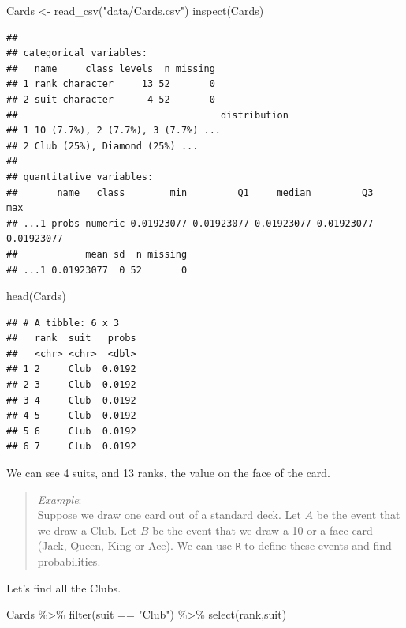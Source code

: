 \documentclass[
]{book}
\newenvironment{Shaded}{\begin{snugshade}}{\end{snugshade}}
\newcommand{\FunctionTok}[1]{\textcolor[rgb]{0.00,0.00,0.00}{#1}}
\newcommand{\NormalTok}[1]{#1}
\newcommand{\OtherTok}[1]{\textcolor[rgb]{0.56,0.35,0.01}{#1}}
\newcommand{\SpecialCharTok}[1]{\textcolor[rgb]{0.00,0.00,0.00}{#1}}
\newcommand{\StringTok}[1]{\textcolor[rgb]{0.31,0.60,0.02}{#1}}
\begin{document}
\begin{Shaded}
\begin{Highlighting}[]
\NormalTok{Cards }\OtherTok{\textless{}{-}} \FunctionTok{read\_csv}\NormalTok{(}\StringTok{"data/Cards.csv"}\NormalTok{)}
\FunctionTok{inspect}\NormalTok{(Cards)}
\end{Highlighting}
\end{Shaded}

\begin{verbatim}
## 
## categorical variables:  
##   name     class levels  n missing
## 1 rank character     13 52       0
## 2 suit character      4 52       0
##                                    distribution
## 1 10 (7.7%), 2 (7.7%), 3 (7.7%) ...            
## 2 Club (25%), Diamond (25%) ...                
## 
## quantitative variables:  
##       name   class        min         Q1     median         Q3        max
## ...1 probs numeric 0.01923077 0.01923077 0.01923077 0.01923077 0.01923077
##            mean sd  n missing
## ...1 0.01923077  0 52       0
\end{verbatim}

\begin{Shaded}
\begin{Highlighting}[]
\FunctionTok{head}\NormalTok{(Cards)}
\end{Highlighting}
\end{Shaded}

\begin{verbatim}
## # A tibble: 6 x 3
##   rank  suit   probs
##   <chr> <chr>  <dbl>
## 1 2     Club  0.0192
## 2 3     Club  0.0192
## 3 4     Club  0.0192
## 4 5     Club  0.0192
## 5 6     Club  0.0192
## 6 7     Club  0.0192
\end{verbatim}

We can see 4 suits, and 13 ranks, the value on the face of the card.

\begin{quote}
\emph{Example}:\\
Suppose we draw one card out of a standard deck. Let \(A\) be the event that we draw a Club. Let \(B\) be the event that we draw a 10 or a face card (Jack, Queen, King or Ace). We can use \texttt{R} to define these events and find probabilities.
\end{quote}

Let's find all the Clubs.

\begin{Shaded}
\begin{Highlighting}[]
\NormalTok{Cards }\SpecialCharTok{\%\textgreater{}\%}
  \FunctionTok{filter}\NormalTok{(suit }\SpecialCharTok{==} \StringTok{"Club"}\NormalTok{) }\SpecialCharTok{\%\textgreater{}\%}
  \FunctionTok{select}\NormalTok{(rank,suit)}
\end{Highlighting}
\end{Shaded}
\end{document}
